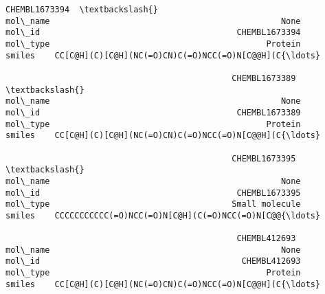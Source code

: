 \documentclass[11pt]{article}
\begin{document}
\begin{tcolorbox}[breakable, size=fbox, boxrule=.5pt, pad at break*=1mm, opacityfill=0]
\begin{Verbatim}[commandchars=\\\{\}]
                                              CHEMBL1673394  \textbackslash{}
mol\_name                                               None
mol\_id                                        CHEMBL1673394
mol\_type                                            Protein
smiles    CC[C@H](C)[C@H](NC(=O)CN)C(=O)NCC(=O)N[C@@H](C{\ldots}

                                              CHEMBL1673389  \textbackslash{}
mol\_name                                               None
mol\_id                                        CHEMBL1673389
mol\_type                                            Protein
smiles    CC[C@H](C)[C@H](NC(=O)CN)C(=O)NCC(=O)N[C@@H](C{\ldots}

                                              CHEMBL1673395  \textbackslash{}
mol\_name                                               None
mol\_id                                        CHEMBL1673395
mol\_type                                     Small molecule
smiles    CCCCCCCCCCC(=O)NCC(=O)N[C@H](C(=O)NCC(=O)N[C@@{\ldots}

                                               CHEMBL412693
mol\_name                                               None
mol\_id                                         CHEMBL412693
mol\_type                                            Protein
smiles    CC[C@H](C)[C@H](NC(=O)CN)C(=O)NCC(=O)N[C@@H](C{\ldots}
\end{Verbatim}
\end{tcolorbox}
        
\end{document}

